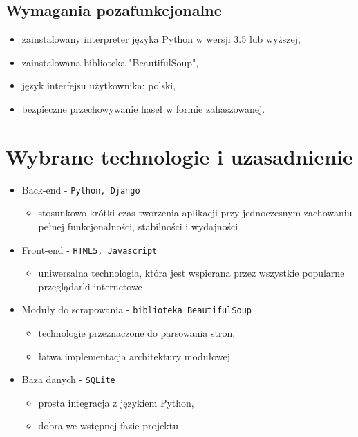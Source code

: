 \documentclass[12pt, titlepage]{article}
\begin{document}
	\subsection{Wymagania pozafunkcjonalne}
		\begin{itemize}
		\item zainstalowany interpreter języka Python w wersji 3.5 lub wyższej,
		\item zainstalowana biblioteka "BeautifulSoup",
		\item język interfejsu użytkownika: polski,
		\item bezpieczne przechowywanie haseł w formie zahaszowanej.
		\newline
		\end{itemize}

	\newpage
	\section{Wybrane technologie i uzasadnienie}
	\begin{itemize}
		\item Back-end - \texttt{Python, Django}
		\begin{itemize}
			\item stosunkowo krótki czas tworzenia aplikacji przy jednoczesnym zachowaniu pełnej funkcjonalności, stabilności i wydajności
		\end{itemize}
		\item Front-end - \texttt{HTML5, Javascript}
		\begin{itemize}
			\item uniwersalna technologia, która jest wspierana przez wszystkie popularne przeglądarki internetowe
		\end{itemize}
		\item Moduły do scrapowania - \texttt{biblioteka BeautifulSoup}
		\begin{itemize}
			\item technologie przeznaczone do parsowania stron,
			\item łatwa implementacja architektury modułowej
		\end{itemize}
		\item Baza danych - \texttt{SQLite}
		\begin{itemize}
			\item prosta integracja z językiem Python,
			\item dobra we wstępnej fazie projektu
		\end{itemize}
	\end{itemize}
	\newpage
\end{document}
